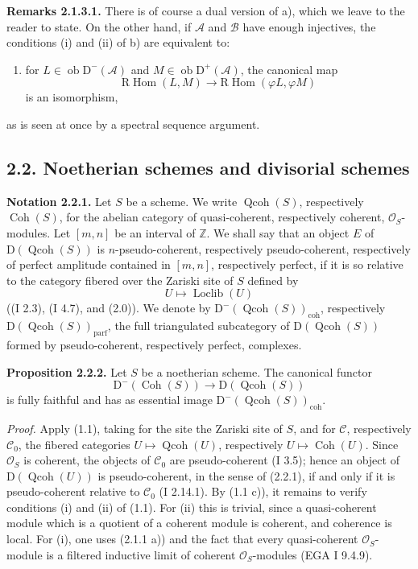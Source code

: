 \documentclass[11pt]{article}
\providecommand{\Loclib}{\operatorname{Loclib}}
\providecommand{\Qcoh}{\operatorname{Qcoh}}
\providecommand{\Coh}{\operatorname{Coh}}
\providecommand{\Ob}{\operatorname{ob}}
\providecommand{\coh}{\operatorname{coh}}
\providecommand{\parf}{\operatorname{parf}}
\begin{document}
\textbf{Remarks 2.1.3.1.} There is of course a dual version of a), which we leave to the reader to state. On the other hand, if $\mathcal A$ and $\mathcal B$ have enough injectives, the conditions (i) and (ii) of b) are equivalent to:
\begin{enumerate}[label=(\roman*),start=3]
\item for $L\in\Ob\mathrm D^{-}(\mathcal A)$ and $M\in\Ob\mathrm D^{+}(\mathcal A)$, the canonical map
\[
\mathrm R\!\operatorname{Hom}(L,M)\longrightarrow
\mathrm R\!\operatorname{Hom}(\varphi L,\varphi M)
\]
is an isomorphism,
\end{enumerate}
as is seen at once by a spectral sequence argument.

\subsection*{2.2. Noetherian schemes and divisorial schemes}

\textbf{Notation 2.2.1.} Let $S$ be a scheme. We write $\Qcoh(S)$, respectively $\Coh(S)$, for the abelian category of quasi-coherent, respectively coherent, $\mathcal O_S$-modules. Let $[m,n]$ be an interval of $\mathbb Z$. We shall say that an object $E$ of $\mathrm D(\Qcoh(S))$ is $n$-pseudo-coherent, respectively pseudo-coherent, respectively of perfect amplitude contained in $[m,n]$, respectively perfect, if it is so relative to the category fibered over the Zariski site of $S$ defined by
\[
U\longmapsto \Loclib(U)
\]
((I 2.3), (I 4.7), and (2.0)). We denote by $\mathrm D^{-}(\Qcoh(S))_{\coh}$, respectively $\mathrm D(\Qcoh(S))_{\parf}$, the full triangulated subcategory of $\mathrm D(\Qcoh(S))$ formed by pseudo-coherent, respectively perfect, complexes.

\textbf{Proposition 2.2.2.} Let $S$ be a noetherian scheme. The canonical functor
\[
\mathrm D^{-}(\Coh(S))\longrightarrow \mathrm D(\Qcoh(S))
\]
is fully faithful and has as essential image $\mathrm D^{-}(\Qcoh(S))_{\coh}$.

\emph{Proof.} Apply (1.1), taking for the site the Zariski site of $S$, and for $\mathcal C$, respectively $\mathcal C_0$, the fibered categories $U\mapsto\Qcoh(U)$, respectively $U\mapsto\Coh(U)$. Since $\mathcal O_S$ is coherent, the objects of $\mathcal C_0$ are pseudo-coherent (I 3.5); hence an object of $\mathrm D(\Qcoh(U))$ is pseudo-coherent, in the sense of (2.2.1), if and only if it is pseudo-coherent relative to $\mathcal C_0$ (I 2.14.1). By (1.1 c)), it remains to verify conditions (i) and (ii) of (1.1). For (ii) this is trivial, since a quasi-coherent module which is a quotient of a coherent module is coherent, and coherence is local. For (i), one uses (2.1.1 a)) and the fact that every quasi-coherent $\mathcal O_S$-module is a filtered inductive limit of coherent $\mathcal O_S$-modules (EGA I 9.4.9).
\end{document}
